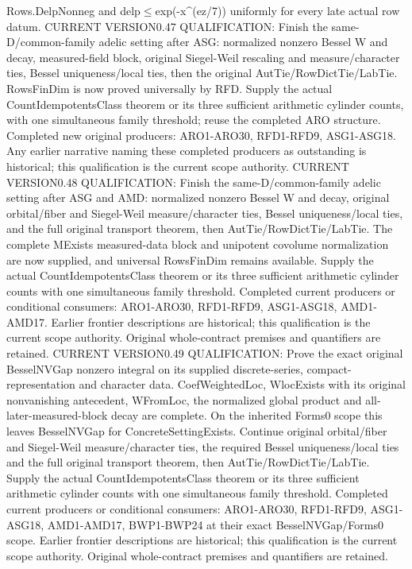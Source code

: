\documentclass[11pt,a4paper]{article}
\numberwithin{equation}{section}
\theoremstyle{remark}\newtheorem{remark}[theorem]{Remark}
\begin{document}
Rows.DelpNonneg and delp$\le$exp(-x\textasciicircum{}(ez/7)) uniformly for every late actual row datum. CURRENT VERSION0.47 QUALIFICATION: Finish the same-D/common-family adelic setting after ASG: normalized nonzero Bessel W and decay, measured-field block, original Siegel-Weil rescaling and measure/character ties, Bessel uniqueness/local ties, then the original AutTie/RowDictTie/LabTie. RowsFinDim is now proved universally by RFD. Supply the actual CountIdempotentsClass theorem or its three sufficient arithmetic cylinder counts, with one simultaneous family threshold; reuse the completed ARO structure. Completed new original producers: ARO1-ARO30, RFD1-RFD9, ASG1-ASG18. Any earlier narrative naming these completed producers as outstanding is historical; this qualification is the current scope authority. CURRENT VERSION0.48 QUALIFICATION: Finish the same-D/common-family adelic setting after ASG and AMD: normalized nonzero Bessel W and decay, original orbital/fiber and Siegel-Weil measure/character ties, Bessel uniqueness/local ties, and the full original transport theorem, then AutTie/RowDictTie/LabTie. The complete MExists measured-data block and unipotent covolume normalization are now supplied, and universal RowsFinDim remains available. Supply the actual CountIdempotentsClass theorem or its three sufficient arithmetic cylinder counts with one simultaneous family threshold. Completed current producers or conditional consumers: ARO1-ARO30, RFD1-RFD9, ASG1-ASG18, AMD1-AMD17. Earlier frontier descriptions are historical; this qualification is the current scope authority. Original whole-contract premises and quantifiers are retained. CURRENT VERSION0.49 QUALIFICATION: Prove the exact original BesselNVGap nonzero integral on its supplied discrete-series, compact-representation and character data. CoefWeightedLoc, WlocExists with its original nonvanishing antecedent, WFromLoc, the normalized global product and all-later-measured-block decay are complete. On the inherited Forms0 scope this leaves BesselNVGap for ConcreteSettingExists. Continue original orbital/fiber and Siegel-Weil measure/character ties, the required Bessel uniqueness/local ties and the full original transport theorem, then AutTie/RowDictTie/LabTie. Supply the actual CountIdempotentsClass theorem or its three sufficient arithmetic cylinder counts with one simultaneous family threshold. Completed current producers or conditional consumers: ARO1-ARO30, RFD1-RFD9, ASG1-ASG18, AMD1-AMD17, BWP1-BWP24 at their exact BesselNVGap/Forms0 scope. Earlier frontier descriptions are historical; this qualification is the current scope authority. Original whole-contract premises and quantifiers are retained.
\end{document}
